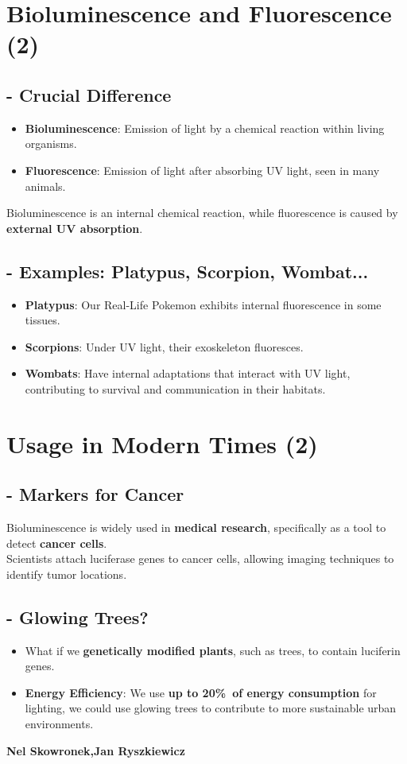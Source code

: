 \documentclass{article}
\begin{document}
\section*{Bioluminescence and Fluorescence (2)}

\subsection*{- Crucial Difference }
\begin{itemize}
 \item\textbf{Bioluminescence}: Emission of light by a chemical reaction within living organisms.
 \item\textbf{Fluorescence}: Emission of light after absorbing UV light, seen in many animals.
\end{itemize}
  
Bioluminescence is an internal chemical reaction, while fluorescence is caused by \textbf{external UV absorption}.

\subsection*{- Examples: Platypus, Scorpion, Wombat... }
\begin{itemize}
 \item\textbf{Platypus}: Our Real-Life Pokemon exhibits internal fluorescence in some tissues.
 \item\textbf{Scorpions}: Under UV light, their exoskeleton fluoresces.
 \item\textbf{Wombats}: Have internal adaptations that interact with UV light, contributing to survival and communication in their habitats.
\end{itemize}


\section*{Usage in Modern Times (2)}

\subsection*{- Markers for Cancer }
Bioluminescence is widely used in \textbf{medical research}, specifically as a tool to detect \textbf{cancer cells}.\\ 
Scientists attach luciferase genes to cancer cells, allowing imaging techniques to identify tumor locations.

\subsection*{- Glowing Trees? }
\begin{itemize}
 \item What if we \textbf{genetically modified plants}, such as trees, to contain luciferin genes.
 \item \textbf{Energy Efficiency}: We use \textbf{up to 20\%\ of energy consumption} for lighting, 
   we could use glowing trees to contribute to more sustainable urban environments.
\end{itemize}

\hfill
\textbf{Nel Skowronek,Jan Ryszkiewicz}
\end{document}
